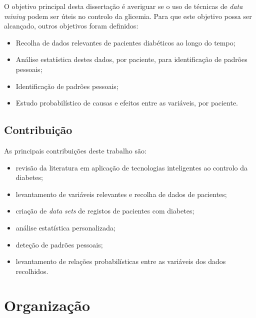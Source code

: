 O objetivo principal desta dissertação é averiguar se o uso de técnicas de \textit{data mining} podem ser úteis no controlo da glicemia. Para que este objetivo possa ser alcançado, outros objetivos foram definidos:

\begin{itemize}
	\item Recolha de dados relevantes de pacientes diabéticos ao longo do tempo;
	\item Análise estatística destes dados, por paciente, para identificação de padrões pessoais;
	\item Identificação de padrões pessoais;
	\item Estudo probabilístico de causas e efeitos entre as variáveis, por paciente.

\end{itemize}


\subsection{Contribuição}

As principais contribuições deste trabalho são:

\begin{itemize}
	\item revisão da literatura em aplicação de tecnologias inteligentes ao controlo da diabetes;
	\item levantamento de variáveis relevantes e recolha de dados de pacientes;
	\item criação de \textit{data sets} de registos de pacientes com diabetes;
	\item análise estatística personalizada;
	\item deteção de padrões pessoais;
	\item levantamento de relações probabilísticas entre as variáveis dos dados recolhidos.
	
\end{itemize}


\section{Organização}

